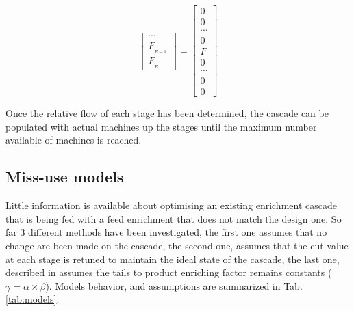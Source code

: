 \begin{equation}
\begin{bmatrix}
     \cdots     \\
     F_{_{E-1}} \\
     F_{_{E}}
 \end{bmatrix}
 =
 \begin{bmatrix}
     0      \\
     0      \\
     \cdots \\
     0      \\
     F      \\
     0      \\
     \cdots \\
     0      \\
     0
\end{bmatrix}
\label{eq:flow}
\end{equation}

Once the relative flow of each stage has been determined, the cascade can be
populated with actual machines up the stages until the maximum number available
of machines is reached.


\subsection{Miss-use models}
Little information is available about optimising an existing enrichment cascade
that is being fed with a feed enrichment that does not match the design one. So
far 3 different methods have been investigated, the first one assumes that no
change are been made on the cascade, the second one, assumes that the cut value
at each stage is retuned to maintain the ideal state of the cascade, the last
one, described in \cite{walker.2017} assumes the tails to product enriching
factor remains constants ($\gamma = \alpha\times\beta$). Models behavior, and
assumptions are summarized in Tab. \ref{tab:models}.




